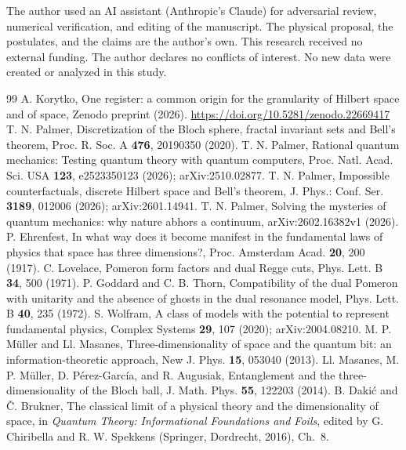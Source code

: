 \documentclass[aps,prd,twocolumn,superscriptaddress,nofootinbib]{revtex4-2}
\begin{document}
\begin{acknowledgments}
The author used an AI assistant (Anthropic's Claude) for adversarial review, numerical verification, and editing of the manuscript. The physical proposal, the postulates, and the claims are the author's own. This research received no external funding. The author declares no conflicts of interest. No new data were created or analyzed in this study.
\end{acknowledgments}

\begin{thebibliography}{99}
 A. Korytko, One register: a common origin for the granularity of Hilbert space and of space, Zenodo preprint (2026). \mbox{\url{https://doi.org/10.5281/zenodo.22669417}}
 T. N. Palmer, Discretization of the Bloch sphere, fractal invariant sets and Bell's theorem, Proc. R. Soc. A \textbf{476}, 20190350 (2020).
 T. N. Palmer, Rational quantum mechanics: Testing quantum theory with quantum computers, Proc. Natl. Acad. Sci. USA \textbf{123}, e2523350123 (2026); arXiv:2510.02877.
 T. N. Palmer, Impossible counterfactuals, discrete Hilbert space and Bell's theorem, J. Phys.: Conf. Ser. \textbf{3189}, 012006 (2026); arXiv:2601.14941.
 T. N. Palmer, Solving the mysteries of quantum mechanics: why nature abhors a continuum, arXiv:2602.16382v1 (2026).
 P. Ehrenfest, In what way does it become manifest in the fundamental laws of physics that space has three dimensions?, Proc. Amsterdam Acad. \textbf{20}, 200 (1917).
 C. Lovelace, Pomeron form factors and dual Regge cuts, Phys. Lett. B \textbf{34}, 500 (1971).
 P. Goddard and C. B. Thorn, Compatibility of the dual Pomeron with unitarity and the absence of ghosts in the dual resonance model, Phys. Lett. B \textbf{40}, 235 (1972).
 S. Wolfram, A class of models with the potential to represent fundamental physics, Complex Systems \textbf{29}, 107 (2020); arXiv:2004.08210.
 M. P. M\"uller and Ll. Masanes, Three-dimensionality of space and the quantum bit: an information-theoretic approach, New J. Phys. \textbf{15}, 053040 (2013).
 Ll. Masanes, M. P. M\"uller, D. P\'erez-Garc\'ia, and R. Augusiak, Entanglement and the three-dimensionality of the Bloch ball, J. Math. Phys. \textbf{55}, 122203 (2014).
 B. Daki\'c and \v{C}. Brukner, The classical limit of a physical theory and the dimensionality of space, in \emph{Quantum Theory: Informational Foundations and Foils}, edited by G. Chiribella and R. W. Spekkens (Springer, Dordrecht, 2016), Ch.~8.

\end{thebibliography}
\end{document}
